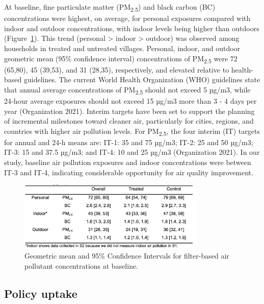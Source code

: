 \documentclass[
  letterpaper,
  DIV=11,
  numbers=noendperiod]{scrartcl}
\begin{document}
At baseline, fine particulate matter (PM\textsubscript{2.5}) and black
carbon (BC) concentrations were highest, on average, for personal
exposures compared with indoor and outdoor concentrations, with indoor
levels being higher than outdoors (Figure~\ref{fig-pm-baseline}). This
trend (personal \textgreater{} indoor \textgreater{} outdoor) was
observed among households in treated and untreated villages. Personal,
indoor, and outdoor geometric mean (95\% confidence interval)
concentrations of PM\textsubscript{2.5} were 72 (65,80), 45 (39,53), and
31 (28,35), respectively, and elevated relative to health-based
guidelines. The current World Health Organization (WHO) guidelines state
that annual average concentrations of PM\textsubscript{2.5} should not
exceed 5 µg/m3, while 24-hour average exposures should not exceed 15
µg/m3 more than 3 - 4 days per year (Organization 2021). Interim targets
have been set to support the planning of incremental milestones toward
cleaner air, particularly for cities, regions, and countries with higher
air pollution levels. For PM\textsubscript{2.5}, the four interim (IT)
targets for annual and 24-h means are: IT-1: 35 and 75 µg/m3; IT-2: 25
and 50 µg/m3; IT-3: 15 and 37.5 µg/m3; and IT-4: 10 and 25 µg/m3
(Organization 2021). In our study, baseline air pollution exposures and
indoor concentrations were between IT-3 and IT-4, indicating
considerable opportunity for air quality improvement.

\begin{figure}[H]

{\centering \includegraphics[width=0.8\textwidth,height=\textheight]{images/fig-pm-baseline.png}

}

\caption{\label{fig-pm-baseline}Geometric mean and 95\% Confidence
Intervals for filter-based air pollutant concentrations at baseline.}

\end{figure}

\hypertarget{policy-uptake}{%
\subsection{Policy uptake}\label{policy-uptake}}
\end{document}
